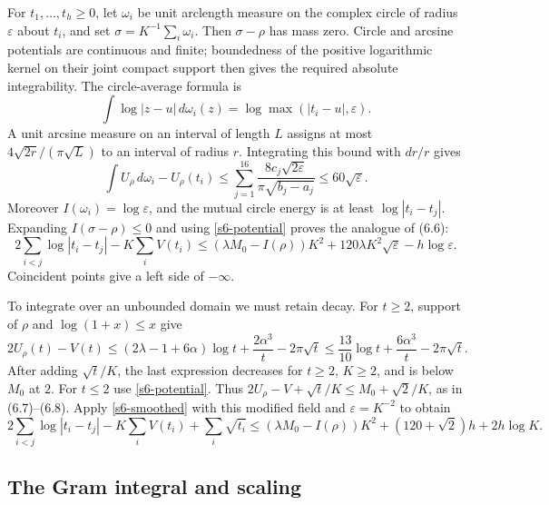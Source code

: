 For $t_1,\ldots,t_h\ge0$, let $\omega_i$ be unit arclength measure on
the complex circle of radius $\varepsilon$ about $t_i$, and set
$\sigma=K^{-1}\sum_i\omega_i$.  Then $\sigma-\rho$ has mass zero.
Circle and arcsine potentials are continuous and finite; boundedness of
the positive logarithmic kernel on their joint compact support then gives
the required absolute integrability.  The circle-average formula is
\[
 \int\log|z-u|\,d\omega_i(z)=\log\max(|t_i-u|,\varepsilon).
\]
A unit arcsine measure on an interval of length $L$ assigns at most
$4\sqrt{2r}/(\pi\sqrt L)$ to an interval of radius $r$.  Integrating
this bound with $dr/r$ gives
\[
 \int U_\rho\,d\omega_i-U_\rho(t_i)
 \le\sum_{j=1}^{16}\frac{8c_j\sqrt{2\varepsilon}}
                              {\pi\sqrt{b_j-a_j}}
 \le60\sqrt\varepsilon.
\]
Moreover $I(\omega_i)=\log\varepsilon$, and the mutual circle energy
is at least $\log|t_i-t_j|$.  Expanding $I(\sigma-\rho)\le0$ and
using \eqref{s6-potential} proves the analogue of (6.6):
\begin{equation}
 2\sum_{i<j}\log|t_i-t_j|-K\sum_iV(t_i)
 \le(\lambda M_0-I(\rho))K^2
       +120\lambda K^2\sqrt\varepsilon-h\log\varepsilon.
 \label{s6-smoothed}
\end{equation}
Coincident points give a left side of $-\infty$.

To integrate over an unbounded domain we must retain decay.  For $t\ge2$,
support of $\rho$ and $\log(1+x)\le x$ give
\begin{equation}
 2U_\rho(t)-V(t)
 \le(2\lambda-1+6\alpha)\log t+\frac{2\alpha^3}{t}-2\pi\sqrt t
 \le\frac{13}{10}\log t+\frac{6\alpha^3}{t}-2\pi\sqrt t.
 \label{s6-tail}
\end{equation}
After adding $\sqrt t/K$, the last expression decreases for $t\ge2$,
$K\ge2$, and is below $M_0$ at $2$.  For $t\le2$ use
\eqref{s6-potential}.  Thus
$2U_\rho-V+\sqrt t/K\le M_0+\sqrt2/K$, as in (6.7)--(6.8).
Apply \eqref{s6-smoothed} with this modified field and
$\varepsilon=K^{-2}$ to obtain
\begin{equation}
 2\sum_{i<j}\log|t_i-t_j|-K\sum_iV(t_i)+\sum_i\sqrt{t_i}
 \le(\lambda M_0-I(\rho))K^2+(120+\sqrt2)h+2h\log K.
 \label{s6-configuration}
\end{equation}

\subsection{The Gram integral and scaling}

